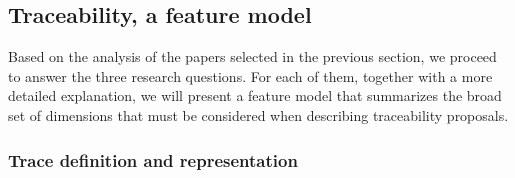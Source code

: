 \subsection{Traceability, a feature model}\label{sec:fm}

Based on the analysis of the papers selected in the previous section, we proceed to answer the three research questions. For each of them, together with a more detailed explanation, we will present a feature model that summarizes the broad set of dimensions that must be considered when describing traceability proposals. 




\subsubsection{Trace definition and representation}
\label{sec:fm:def}

